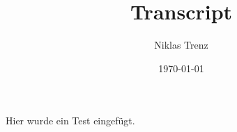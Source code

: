 


\title{Transcript}
\author{Niklas Trenz}
\date{\today}


\maketitle
\tableofcontents

Hier wurde ein Test eingefügt.





